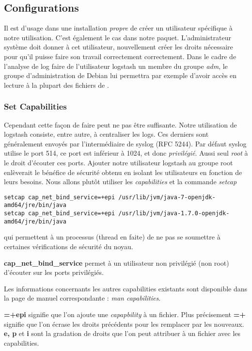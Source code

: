 \subsection{Configurations}
Il est d'usage dans une installation \textit{propre} de créer un utilisateur spécifique
à notre utilisation. C'est également le cas dans notre paquet. L'administrateur 
système doit donner à cet utilisateur, nouvellement créer les droits nécessaire 
pour qu'il puisse faire son travail correctement correctement. Dans le cadre de 
l'analyse de log faire de l'utilisateur logstash un membre du groupe \emph{adm}, 
le groupe d'administration de Debian lui permettra par exemple d'avoir accès en 
lecture à la plupart des fichiers de .

\subsubsection{Set Capabilities}
Cependant cette façon de faire peut ne pas être suffisante.
Notre utilisation de logstash consiste, entre autre, à centraliser les \gls{logs}. 
Ces derniers sont généralement envoyés par l'intermédiaire de syslog (RFC 5244).
Par défaut syslog utilise le port 514, ce port est inférieur à 1024, et donc \textit{privilégié}.
Aussi seul \emph{root} à le droit d'écouter ces ports. Ajouter notre utilisateur 
logstash au groupe root enlèverait le bénéfice de sécurité obtenu en isolant les 
utilisateurs en fonction de leurs besoins. Nous allons plutôt utiliser les 
\emph{capabilities} 
et la commande \emph{setcap}
\begin{lstlisting}[style=code,label={lst:setcapabilities}]
setcap cap_net_bind_service=+epi /usr/lib/jvm/java-7-openjdk-amd64/jre/bin/java
setcap cap_net_bind_service=+epi /usr/lib/jvm/java-1.7.0-openjdk-amd64/jre/bin/java
\end{lstlisting}
qui permettent à un processus (thread en faite) de ne pas se soumettre à certaines 
vérifications de sécurité du noyau.

\textbf{cap\_net\_bind\_service} permet à un utilisateur non privilégié (non root) 
d'écouter sur les ports privilégiés.

Les informations concernants les autres capabilities existants sont disponible dans
la page de manuel correspondante : \emph{man capabilities}.

\textbf{=+epi} signifie que l'on ajoute une \emph{capapbility} à un fichier. Plus 
précisement \textbf{=+} signifie que l'on écrase les droits précédents pour les remplacer
par les nouveaux. \textbf{e, p} et \textbf{i} sont la gradation de droits que l'on peut 
attribuer à un fichier avec les capabilities. 

